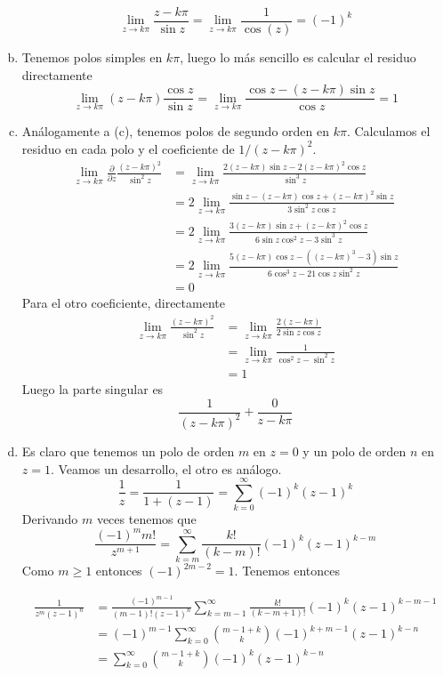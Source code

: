 \documentclass[twoside]{article}
\begin{document}
\begin{solucion}
\begin{enumerate}[(a)]
$$
\lim_{z\to k\pi} \frac{z-k\pi}{\sin z} = \lim_{z \to k\pi} \frac{1}{\cos(z)} = (-1)^{k}
$$
\item Tenemos polos simples en $k\pi$, luego lo más sencillo es calcular el residuo directamente
$$
\lim_{z\to k \pi}(z-k\pi)\frac{\cos z}{\sin z} = \lim_{z\to k \pi}\frac{\cos z-(z-k\pi)\sin z}{\cos z} = 1
$$
\item Análogamente a (c), tenemos polos de segundo orden en $k\pi$. Calculamos el residuo en cada polo y el coeficiente de $1/(z-k\pi)^2$.
\begin{align*}
\lim_{z\to k\pi} \frac{\partial }{\partial z}\frac{(z-k\pi)^2}{\sin^2 z} &= \lim_{z\to k\pi} \frac{2(z-k\pi)\sin z - 2(z-k\pi)^2\cos z}{\sin^3 z} \\
&=2\lim_{z\to k\pi} \frac{\sin z - (z-k\pi)\cos z + (z-k\pi)^2\sin z}{3\sin^2 z \cos z}\\
&=2\lim_{z\to k\pi} \frac{3(z-k\pi)\sin z+ (z-k\pi)^2\cos z}{6\sin z \cos^2 z - 3\sin^3z}\\
&= 2\lim_{z\to k\pi} \frac{5(z-k\pi)\cos z - ((z-k\pi)^3 -3)\sin z}{6 \cos^3z - 21 \cos z \sin^2 z} \\ 
&=0
\end{align*}
Para el otro coeficiente, directamente
\begin{align*}
\lim_{z\to k\pi}\frac{(z-k\pi)^2}{\sin^2 z} &= \lim_{z\to k\pi} \frac{2(z-k\pi)}{2\sin z \cos z} \\
&=\lim_{z\to k\pi} \frac{1}{\cos^2 z - \sin^2 z}\\
&=1
\end{align*}
Luego la parte singular es
$$
\frac{1}{(z-k\pi)^2}+ \frac{0}{z-k\pi}
$$

\item Es claro que tenemos un polo de orden $m$ en $z=0$ y un polo de orden $n$ en $z=1$. Veamos un desarrollo, el otro es análogo.
$$
\frac{1}{z}=\frac{1}{1+(z-1)}= \sum_{k=0}^\infty (-1)^k(z-1)^k
$$
Derivando $m$ veces tenemos que
$$
\frac{(-1)^mm!}{z^{m+1}}= \sum_{k=m}^\infty \frac{k!}{(k-m)!}(-1)^k(z-1)^{k-m}
$$
Como $m\geq 1$ entonces $(-1)^{2m-2} = 1$. Tenemos entonces

\begin{align*}
\frac{1}{z^m(z-1)^n} &= \frac{(-1)^{m-1}}{(m-1)!(z-1)^n}\sum_{k=m-1}^\infty \frac{k!}{(k-m+1)!}(-1)^k(z-1)^{k-m-1}\\
& = {(-1)^{m-1}}\sum_{k=0}^\infty \binom{m-1+k}{k}(-1)^{k+m-1}(z-1)^{k-n}\\
&=\sum_{k=0}^\infty \binom{m-1+k}{k}(-1)^{k}(z-1)^{k-n}
\end{align*}
\end{enumerate}
\end{solucion}
\newpage
\end{document}
